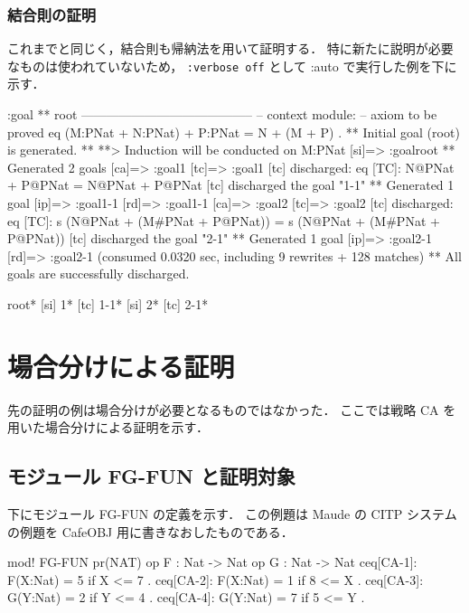 \documentclass[a4paper,oneside,10pt,here]{memoir}
\newenvironment{vvtm}%
{\parskip=0pt\lineskip=0pt\begin{center}\begin{minipage}{0.8\textwidth}\begin{snugshade}}%
  {\end{snugshade}\end{minipage}\end{center}}
\begin{document}
\subsubsection{結合則の証明}
これまでと同じく，結合則も帰納法を用いて証明する．
特に新たに説明が必要なものは使われていないため，
\verb|:verbose off| として :auto で実行した例を下に示す．
\begin{vvtm}
  \begin{simplev}
:goal { ** root -----------------------------------------
  -- context module: %
  -- axiom to be proved
    eq (M:PNat + N:PNat) + P:PNat = N + (M + P) .
}
** Initial goal (root) is generated. **
**> Induction will be conducted on M:PNat 
[si]=> :goal{root}
** Generated 2 goals
[ca]=> :goal{1}
[tc]=> :goal{1}
[tc] discharged: 
  eq [TC]: N@PNat + P@PNat = N@PNat + P@PNat
[tc] discharged the goal "1-1"
** Generated 1 goal
[ip]=> :goal{1-1}
[rd]=> :goal{1-1}
[ca]=> :goal{2}
[tc]=> :goal{2}
[tc] discharged: 
  eq [TC]: s (N@PNat + (M#PNat + P@PNat))
      = s (N@PNat + (M#PNat + P@PNat))
[tc] discharged the goal "2-1"
** Generated 1 goal
[ip]=> :goal{2-1}
[rd]=> :goal{2-1}
(consumed 0.0320 sec, including 9 rewrites + 128 matches)
** All goals are successfully discharged.

root*
[si]  1*
[tc]  1-1*
[si]  2*
[tc]  2-1*
  \end{simplev}
\end{vvtm}

\section{場合分けによる証明}
先の証明の例は場合分けが必要となるものではなかった．
ここでは戦略 CA を用いた場合分けによる証明を示す．

\subsection{モジュール FG-FUN と証明対象}

下にモジュール FG-FUN の定義を示す．
この例題は Maude の CITP システムの例題を CafeOBJ 用に書きなおしたものである．

\begin{vvtm}
  \begin{simplev}
mod! FG-FUN {
  pr(NAT)
  op F : Nat -> Nat 
  op G : Nat -> Nat
  ceq[CA-1]: F(X:Nat) = 5 if X <= 7 .
  ceq[CA-2]: F(X:Nat) = 1 if 8 <= X .
  ceq[CA-3]: G(Y:Nat) = 2 if Y <= 4 .
  ceq[CA-4]: G(Y:Nat) = 7 if 5 <= Y .
}
  \end{simplev}
\end{vvtm}
\end{document}
